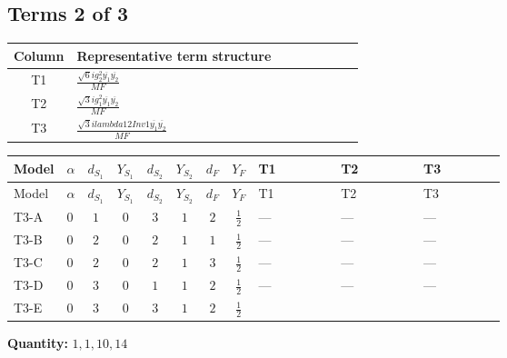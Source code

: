 \documentclass[8pt]{article}
\begin{document}
\begin{landscape}
\subsection*{Terms 2 of 3}
\begin{center}
\begin{tabular}{@{}c >{\raggedright\arraybackslash}p{0.82\linewidth}@{}}
\toprule
Column & Representative term structure \\
\midrule
T1 & \(\displaystyle \frac{\sqrt{6} i g_{2}^{2} \overline{y_{1}} \overline{y_{2}}}{MF}\) \\
\midrule
T2 & \(\displaystyle \frac{\sqrt{3} i g_{1}^{2} \overline{y_{1}} \overline{y_{2}}}{MF}\) \\
\midrule
T3 & \(\displaystyle \frac{\sqrt{3} i lambda12Inv1 \overline{y_{1}} \overline{y_{2}}}{MF}\) \\
\midrule
\bottomrule
\end{tabular}
\end{center}
\smallskip
\tiny
\begin{longtable}{@{}llcccccc >{\raggedright\arraybackslash}p{0.21\linewidth} >{\raggedright\arraybackslash}p{0.21\linewidth} >{\raggedright\arraybackslash}p{0.21\linewidth}@{}}
\toprule
Model & $\alpha$ & $d_{S_1}$ & $Y_{S_1}$ & $d_{S_2}$ & $Y_{S_2}$ & $d_F$ & $Y_F$ & T1 & T2 & T3 \\
\midrule
\endfirsthead
\toprule
Model & $\alpha$ & $d_{S_1}$ & $Y_{S_1}$ & $d_{S_2}$ & $Y_{S_2}$ & $d_F$ & $Y_F$ & T1 & T2 & T3 \\
\midrule
\endhead
T3-A & $0$ & $1$ & $0$ & $3$ & $1$ & $2$ & $\frac{1}{2}$ & --- & --- & --- \\
\midrule
T3-B & $0$ & $2$ & $0$ & $2$ & $1$ & $1$ & $\frac{1}{2}$ & --- & --- & --- \\
\midrule
T3-C & $0$ & $2$ & $0$ & $2$ & $1$ & $3$ & $\frac{1}{2}$ & --- & --- & --- \\
\midrule
T3-D & $0$ & $3$ & $0$ & $1$ & $1$ & $2$ & $\frac{1}{2}$ & --- & --- & --- \\
\midrule
T3-E & $0$ & $3$ & $0$ & $3$ & $1$ & $2$ & $\frac{1}{2}$ & \scriptsize\adjustbox{max width=\linewidth}{$\begin{gathered} - \frac{\sqrt{6} i g_{2}^{2} \overline{y_{1}} \overline{y_{2}}}{3 MF}\end{gathered}$} & \scriptsize\adjustbox{max width=\linewidth}{$\begin{gathered} - \frac{\sqrt{3} i g_{1}^{2} \overline{y_{1}} \overline{y_{2}}}{8 MF}\end{gathered}$} & \scriptsize\adjustbox{max width=\linewidth}{$\begin{gathered} \frac{\sqrt{3} i lambda12Inv1 \overline{y_{1}} \overline{y_{2}}}{6 MF}\end{gathered}$} \\
\midrule
\bottomrule
\end{longtable}
\clearpage
\noindent\textbf{Quantity: }$\mathrm{1,1,10,14}$\par\smallskip

\end{landscape}
\end{document}
